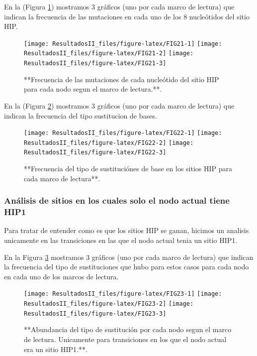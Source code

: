 \documentclass[
]{book}
\begin{document}
En la (Figura \ref{fig:FIG21}) mostramos 3 gráficos (uno por cada marco de lectura) que indican la frecuencia de las mutaciones en cada uno de los 8 nucleótidos del sitio HIP.

\begin{figure}

{\centering \texttt{[image: ResultadosII\_files/figure-latex/FIG21-1]} \texttt{[image: ResultadosII\_files/figure-latex/FIG21-2]} \texttt{[image: ResultadosII\_files/figure-latex/FIG21-3]} 

}

\caption{**Frecuencia de las mutaciones de cada nucleótido del sitio HIP para cada nodo segun el marco de lectura.**.}\label{fig:FIG21}
\end{figure}

En la (Figura \ref{fig:FIG22}) mostramos 3 gráficos (uno por cada marco de lectura) que indican la frecuencia del tipo sustitucion de bases.

\begin{figure}

{\centering \texttt{[image: ResultadosII\_files/figure-latex/FIG22-1]} \texttt{[image: ResultadosII\_files/figure-latex/FIG22-2]} \texttt{[image: ResultadosII\_files/figure-latex/FIG22-3]} 

}

\caption{**Frecuencia del tipo de sustituciónes de base en los sitios HIP para cada marco de lectura**.}\label{fig:FIG22}
\end{figure}

\hypertarget{anuxe1lisis-de-sitios-en-los-cuales-solo-el-nodo-actual-tiene-hip1}{%
\subsubsection{Análisis de sitios en los cuales solo el nodo actual tiene HIP1}\label{anuxe1lisis-de-sitios-en-los-cuales-solo-el-nodo-actual-tiene-hip1}}

Para tratar de entender como es que los sitios HIP se ganan, hicimos un analisis unicamente en las transiciones en las que el nodo actual tenia un sitio HIP1.

En la Figura \ref{fig:FIG23} mostramos 3 gráficos (uno por cada marco de lectura) que indican la frecuencia del tipo de sustituciones que hubo para estos casos para cada nodo en cada uno de los marcos de lectura.

\begin{figure}

{\centering \texttt{[image: ResultadosII\_files/figure-latex/FIG23-1]} \texttt{[image: ResultadosII\_files/figure-latex/FIG23-2]} \texttt{[image: ResultadosII\_files/figure-latex/FIG23-3]} 

}

\caption{**Abundancia del tipo de sustitución por cada nodo segun el marco de lectura. Unicamente para transiciones en los que el nodo actual era un sitio HIP1.**.}\label{fig:FIG23}
\end{figure}
\end{document}
